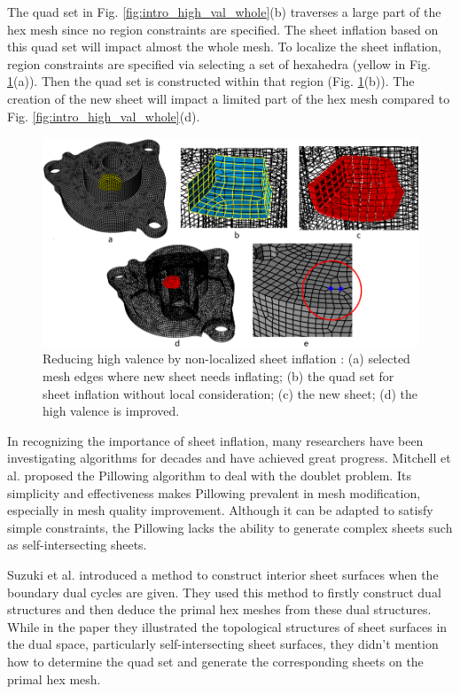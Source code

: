 \documentclass[final,5p,times,twocolumn]{elsarticle}
\begin{document}
The quad set in Fig. \ref{fig:intro_high_val_whole}(b) traverses a large part of the hex mesh since no region constraints are specified. The sheet inflation based on this quad set will impact almost the whole mesh. To localize the sheet inflation, region constraints are specified via selecting a set of hexahedra (yellow in Fig. \ref{fig:intro_high_val_localized_inf}(a)). Then the quad set is constructed within that region (Fig. \ref{fig:intro_high_val_localized_inf}(b)). The creation of the new sheet will impact a limited part of the hex mesh compared to Fig. \ref{fig:intro_high_val_whole}(d).

\begin{figure}[htbp]
\begin{center}
\includegraphics[width=15cm]{rev_figures/intro_high_val_localized_inf.png}
\caption{Reducing high valence by non-localized sheet inflation : (a) selected mesh edges where new sheet needs inflating; (b) the quad set for sheet inflation without local consideration; (c) the new sheet; (d) the high valence is improved.}
\label{fig:intro_high_val_localized_inf}
\end{center}
\end{figure}

In recognizing the importance of sheet inflation, many researchers have been investigating algorithms for decades and have achieved great progress. Mitchell et al. proposed the Pillowing algorithm to deal with the doublet problem\cite{Mitchell:1995wa}.  Its simplicity and effectiveness makes Pillowing prevalent in mesh modification, especially in mesh quality improvement. Although it can be adapted to satisfy simple constraints, the Pillowing lacks the ability to generate complex sheets such as self-intersecting sheets.

Suzuki et al. introduced a method to construct interior sheet surfaces when the boundary dual cycles are given\cite{Suzuki:2010hn}. They used this method to firstly construct dual structures and then deduce the primal hex meshes from these dual structures. While in the paper they illustrated the topological structures of sheet surfaces in the dual space, particularly self-intersecting sheet surfaces, they didn't mention how to determine the quad set and generate the corresponding sheets on the primal hex mesh.
\end{document}
